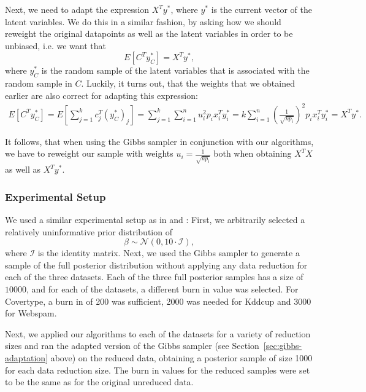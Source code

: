 Next, we need to adapt the expression
$X^Ty^\ast$, where $y^\ast$ is the current vector of the latent
variables. We do this in a similar fashion, by asking
how we should reweight the original datapoints as well as the
latent variables in order to be unbiased, i.e. we want that
\begin{equation*}
    E\left[ C^T y_C^\ast \right] = X^T y^\ast,
\end{equation*}
where $y_C^\ast$ is the random sample of the latent variables that
is associated with the random sample in $C$.
Luckily, it turns out, that the weights that we obtained earlier
are also correct for adapting this expression:
\begin{align*}
    E\left[ C^T y_C^\ast \right] = E\left[ \sum_{j=1}^k c_j^T (y_C^\ast)_j \right]
    = \sum_{j=1}^k \sum_{i=1}^n u_i^2 p_i x_i^T y^\ast_i
    = k \sum_{i=1}^n \left(\frac{1}{\sqrt{kp_i}}\right)^2 p_i x_i^T y^\ast_i
    = X^T y^\ast.
\end{align*}

It follows, that when using the Gibbs sampler in conjunction
with our algorithms, we have to reweight our sample with weights
$u_i = \frac{1}{\sqrt{k p_i}}$ both when obtaining $X^TX$ as
well as $X^Ty^\ast$.

\subsubsection{Experimental Setup}

We used a similar experimental setup
as in \cite{scalable-bayesian-logreg} and
\cite{bayesian-regression}:
First, we arbitrarily selected a relatively uninformative
prior distribution of
\begin{equation*}
    \beta \sim \mathcal{N}(0, 10 \cdot \mathcal{I}),
\end{equation*}
where $\mathcal{I}$ is the identity matrix.
Next, we used the Gibbs sampler
to generate a sample of the full posterior
distribution without applying any data reduction for each
of the three datasets.
Each of the three full posterior samples has a size of $10000$,
and for each of the datasets, a different
burn in value was selected. For Covertype, a burn in
of 200 was sufficient, 2000 was needed for Kddcup and 3000
for Webspam.

Next, we applied our algorithms to each of the datasets
for a variety of reduction sizes and ran the adapted version of
the Gibbs sampler (see Section~\ref{sec:gibbs-adaptation} above)
on the reduced data, obtaining a posterior sample of size 1000
for each data reduction size. The burn in values for
the reduced samples were set to be
the same as for the original unreduced data.


